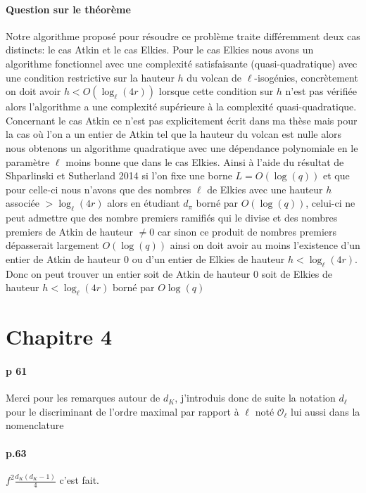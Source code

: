 \documentclass[10pt,a4paper]{article}
\theoremstyle{plain}
\theoremstyle{definition}
\theoremstyle{definition}
\theoremstyle{definition}
\theoremstyle{definition}
\theoremstyle{definition}
\theoremstyle{remark}
\theoremstyle{remark}
\theoremstyle{definition}
\begin{document}
\paragraph{Question sur le théorème}{Notre algorithme proposé pour résoudre ce 
problème traite différemment deux cas distincts: le cas Atkin et le cas Elkies.
Pour le cas Elkies nous avons un algorithme fonctionnel avec une complexité
satisfaisante (quasi-quadratique) avec une condition restrictive sur la hauteur
$h$ du volcan de $\ell$-isogénies, concrètement on doit avoir $h< O(\log_{\ell}
(4r))$ lorsque cette condition sur $h$ n'est pas vérifiée alors 
l'algorithme a une complexité supérieure à la complexité quasi-quadratique. 
Concernant le cas Atkin ce n'est pas explicitement écrit dans ma thèse mais 
pour la cas où l'on a un entier de Atkin tel que la hauteur du volcan est 
nulle alors nous obtenons un algorithme quadratique avec une dépendance 
polynomiale en le paramètre $\ell$ moins bonne que dans le cas Elkies. 
Ainsi à l'aide du résultat de Shparlinski et Sutherland 2014 si l'on fixe une 
borne $L=O(\log(q))$ et que pour celle-ci nous n'avons que des nombres $\ell$ de 
Elkies avec une hauteur $h$ associée $>\log_{\ell}(4r)$ alors en étudiant 
$d_{\pi}$ borné par $O(\log(q))$, celui-ci ne peut admettre que des nombre premiers ramifiés qui le divise et des nombres premiers de Atkin de hauteur $\neq 0$ car sinon ce produit de nombres premiers dépasserait largement $O(\log(q))$ ainsi on doit avoir au moins l'existence d'un entier de Atkin de hauteur $0$  ou d'un entier de Elkies de hauteur $h<\log_{\ell}(4r)$. Donc on peut trouver un entier soit de Atkin de hauteur $0$ soit de Elkies de hauteur $h<\log_{\ell}(4r)$ borné par $O\log(q)$}

\section{Chapitre 4}

\paragraph{p 61}{Merci pour les remarques autour de $d_{K}$, j'introduis donc de suite la notation $d_{\ell}$ pour le discriminant de l'ordre maximal par rapport à $\ell$ noté $\mathcal{O}_{\ell}$ lui aussi dans la nomenclature}

\paragraph{p.63}{$f^2\frac{d_K (d_K-1)}{4}$ c'est fait.}
\end{document}
